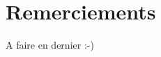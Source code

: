 \documentclass[a4paper,11pt,twoside]{StyleThese}
\begin{document}


\dominitoc


 \cleardoublepage

\section*{Remerciements}

A faire en dernier :-)

\tableofcontents

\mainmatter



\appendix






\end{document}
